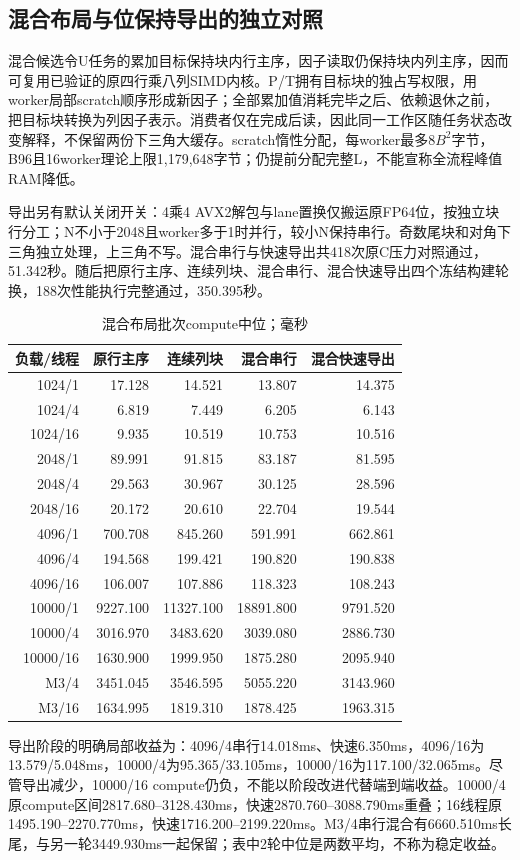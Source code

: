 \documentclass[UTF8,a4paper,11pt]{ctexart}
\begin{document}
\subsection{混合布局与位保持导出的独立对照}
混合候选令U任务的累加目标保持块内行主序，因子读取仍保持块内列主序，因而可复用已验证的原四行乘八列SIMD内核。P/T拥有目标块的独占写权限，用worker局部scratch顺序形成新因子；全部累加值消耗完毕之后、依赖退休之前，把目标块转换为列因子表示。消费者仅在完成后读，因此同一工作区随任务状态改变解释，不保留两份下三角大缓存。scratch惰性分配，每worker最多$8B^2$字节，B96且16worker理论上限1,179,648字节；仍提前分配完整L，不能宣称全流程峰值RAM降低。

导出另有默认关闭开关：4乘4 AVX2解包与lane置换仅搬运原FP64位，按独立块行分工；N不小于2048且worker多于1时并行，较小N保持串行。奇数尾块和对角下三角独立处理，上三角不写。混合串行与快速导出共418次原C压力对照通过，51.342秒。随后把原行主序、连续列块、混合串行、混合快速导出四个冻结构建轮换，188次性能执行完整通过，350.395秒。
\begin{table}[htbp]\centering\small\setlength{\tabcolsep}{3pt}
\caption{混合布局批次compute中位；毫秒}\label{tab:hybridtiles}
\begin{tabular}{rrrrr}\toprule
负载/线程&原行主序&连续列块&混合串行&混合快速导出\\\midrule
1024/1&17.128&14.521&13.807&14.375\\
1024/4&6.819&7.449&6.205&6.143\\
1024/16&9.935&10.519&10.753&10.516\\
2048/1&89.991&91.815&83.187&81.595\\
2048/4&29.563&30.967&30.125&28.596\\
2048/16&20.172&20.610&22.704&19.544\\
4096/1&700.708&845.260&591.991&662.861\\
4096/4&194.568&199.421&190.820&190.838\\
4096/16&106.007&107.886&118.323&108.243\\
10000/1&9227.100&11327.100&18891.800&9791.520\\
10000/4&3016.970&3483.620&3039.080&2886.730\\
10000/16&1630.900&1999.950&1875.280&2095.940\\
M3/4&3451.045&3546.595&5055.220&3143.960\\
M3/16&1634.995&1819.310&1878.425&1963.315\\\bottomrule
\end{tabular}\end{table}
导出阶段的明确局部收益为：4096/4串行14.018ms、快速6.350ms，4096/16为13.579/5.048ms，10000/4为95.365/33.105ms，10000/16为117.100/32.065ms。尽管导出减少，10000/16 compute仍负，不能以阶段改进代替端到端收益。10000/4原compute区间2817.680--3128.430ms，快速2870.760--3088.790ms重叠；16线程原1495.190--2270.770ms，快速1716.200--2199.220ms。M3/4串行混合有6660.510ms长尾，与另一轮3449.930ms一起保留；表中2轮中位是两数平均，不称为稳定收益。
\end{document}
